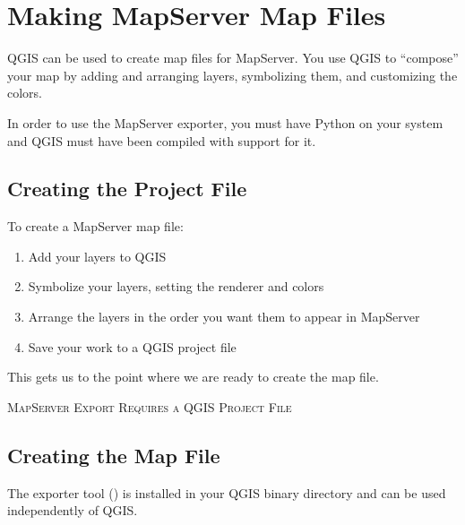 \section{Making MapServer Map Files}\label{sec:mapserver_export}

\updatedisclaimer

QGIS can be used to create map files for MapServer. You use QGIS to
``compose'' your map by adding and arranging layers, symbolizing them, and
customizing the colors.

In order to use the MapServer exporter, you must have Python on your
system and QGIS must have been compiled with support for it.

\subsection{Creating the Project File}

To create a MapServer map file:

\begin{enumerate}
\item Add your layers to QGIS
\item Symbolize your layers, setting the renderer and colors
\item Arrange the layers in the order you want them to appear in MapServer
\item Save your work to a QGIS project file
\end{enumerate} 

This gets us to the point where we are ready to create the map file.

\begin{Tip}\caption{\textsc{MapServer Export Requires a QGIS Project File}}
\end{Tip} 

\subsection{Creating the Map File}

The exporter tool () is installed in your QGIS binary directory and can be used independently of QGIS. 

